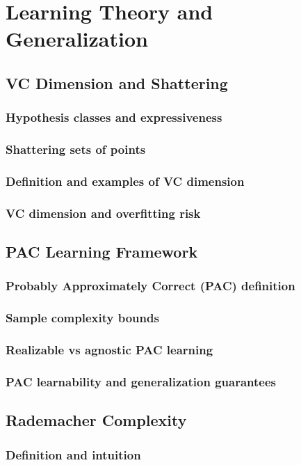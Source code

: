 \chapter{Learning Theory and Generalization}

\section{VC Dimension and Shattering}
\subsection{Hypothesis classes and expressiveness}
\subsection{Shattering sets of points}
\subsection{Definition and examples of VC dimension}
\subsection{VC dimension and overfitting risk}

\section{PAC Learning Framework}
\subsection{Probably Approximately Correct (PAC) definition}
\subsection{Sample complexity bounds}
\subsection{Realizable vs agnostic PAC learning}
\subsection{PAC learnability and generalization guarantees}

\section{Rademacher Complexity}
\subsection{Definition and intuition}
